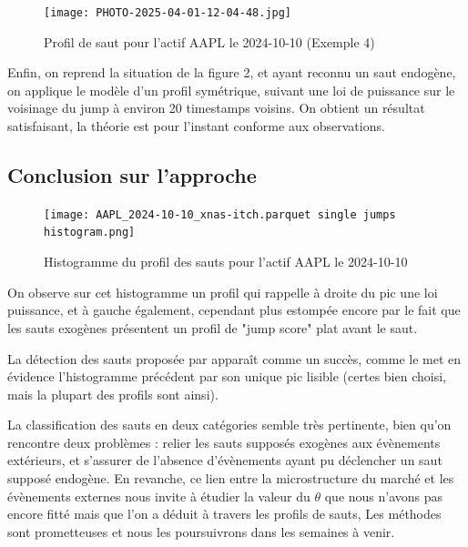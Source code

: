 \documentclass[10pt,a4paper]{article}
\theoremstyle{definition}
\theoremstyle{remark}
\begin{document}
\begin{itemize}
    \vspace{1cm}

    \begin{figure}[H]
        \centering
        \texttt{[image: PHOTO-2025-04-01-12-04-48.jpg]}
        \caption{Profil de saut pour l'actif AAPL le 2024-10-10 (Exemple 4)}
        \label{fig:jump_example_4}
    \end{figure}

    Enfin, on reprend la situation de la figure 2, et ayant reconnu un saut endogène, on applique le modèle d'un profil symétrique, suivant une loi de puissance sur le voisinage du jump à environ 20 timestamps voisins. On obtient un résultat satisfaisant, la théorie est pour l'instant conforme aux observations.
    
    \subsection{Conclusion sur l'approche}

    \begin{figure}[H]
        \centering
        \texttt{[image: AAPL\_2024-10-10\_xnas-itch.parquet single jumps histogram.png]}
        \caption{Histogramme du profil des sauts pour l'actif AAPL le 2024-10-10}
        \label{fig:jump_example_4}
    \end{figure}

    On observe sur cet histogramme un profil qui rappelle à droite du pic une loi puissance, et à gauche également, cependant plus estompée encore par le fait que les sauts exogènes présentent un profil de "jump score" plat avant le saut.
    \vspace{0.3cm}

    La détection des sauts proposée par \cite{marcaccioli2021exogenous} apparaît comme un succès, comme le met en évidence l'histogramme précédent par son unique pic lisible (certes bien choisi, mais la plupart des profils sont ainsi).
    \vspace{0.3cm}

    La classification des sauts en deux catégories semble très pertinente, bien qu'on rencontre deux problèmes : relier les sauts supposés exogènes aux évènements extérieurs, et s'assurer de l'absence d'évènements ayant pu déclencher un saut supposé endogène. En revanche, ce lien entre la microstructure du marché et les évènements externes nous invite à étudier la valeur du $\theta$ que nous n'avons pas encore fitté mais que l'on a déduit à travers les profils de sauts, Les méthodes sont prometteuses et nous les poursuivrons dans les semaines à venir.
    


\end{itemize}
\end{document}
